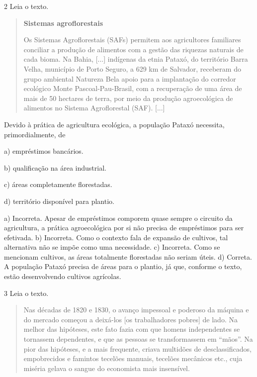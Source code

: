 \num{2} Leia o texto.

\begin{quote}
\textbf{Sistemas agroflorestais}

Os Sistemas Agroflorestais (SAFs) permitem aos agricultores familiares conciliar a produção de alimentos com a gestão das riquezas naturais de cada bioma. Na Bahia, {[}...{]} indígenas da etnia Pataxó, do território Barra Velha, município de Porto Seguro, a 629 km de Salvador, receberam do grupo ambiental Natureza Bela apoio para a implantação do corredor ecológico Monte Pascoal-Pau-Brasil, com a recuperação de uma área de mais de 50 hectares de terra, por meio da produção agroecológica de alimentos no Sistema Agroflorestal (SAF). {[}...{]}

\end{quote}

Devido à prática de agricultura ecológica, a população Pataxó necessita,
primordialmente, de

a)  empréstimos bancários.

b)  qualificação na área industrial.

c)  áreas completamente florestadas.

d)  território disponível para plantio.

a) Incorreta. Apesar de empréstimos comporem quase sempre o circuito da
agricultura, a prática agroecológica por si não precisa de empréstimos
para ser efetivada.
b) Incorreta. Como o contexto fala de expansão de cultivos, tal alternativa
não se impõe como uma necessidade.
c) Incorreta. Como se mencionam cultivos, as áreas totalmente florestadas
não seriam úteis.
d) Correta. A população Pataxó precisa de áreas para o plantio, já que,
conforme o texto, estão desenvolvendo cultivos agrícolas.


\num{3} Leia o texto.

\begin{quote}
Nas décadas de 1820 e 1830, o avanço impessoal e poderoso da
máquina e do mercado começou a deixá-los [os trabalhadores pobres] de lado. Na melhor das
hipóteses, este fato fazia com que homens independentes se tornassem
dependentes, e que as pessoas se transformassem em ``mãos''. Na pior das
hipóteses, e a mais frequente, criava multidões de desclassificados,
empobrecidos e famintos tecelões manuais, tecelões mecânicos etc., cuja
miséria gelava o sangue do economista mais insensível.

\end{quote}

